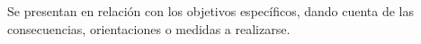 \titlespacing{\chapter}{0pt}{-30pt}{0pt}
\begin{recomendaciones}
\label{cap:recomendaciones}
 
Se presentan en relación con los objetivos específicos, dando cuenta de las consecuencias, orientaciones o medidas a realizarse.
    
\end{recomendaciones}